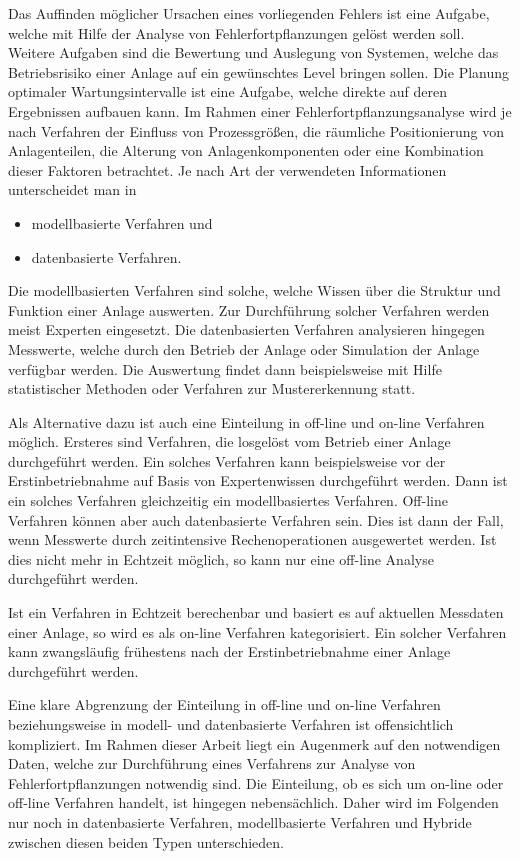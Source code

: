 Das Auffinden m\"oglicher Ursachen eines vorliegenden Fehlers ist eine Aufgabe, welche mit Hilfe der Analyse von Fehlerfortpflanzungen gel\"ost werden soll. Weitere Aufgaben sind die Bewertung und Auslegung von Systemen, welche das Betriebsrisiko einer Anlage auf ein gew\"unschtes Level bringen sollen. Die Planung optimaler Wartungsintervalle ist eine Aufgabe, welche direkte auf deren Ergebnissen aufbauen kann. \newline
Im Rahmen einer Fehlerfortpflanzungsanalyse wird je nach Verfahren der Einfluss von Prozessgr\"o\ss{}en, die r\"aumliche Positionierung von Anlagenteilen, die Alterung von Anlagenkomponenten oder eine Kombination dieser Faktoren betrachtet. Je nach Art der verwendeten Informationen unterscheidet man in \begin{itemize}
\item modellbasierte Verfahren und
\item datenbasierte Verfahren. 
\end{itemize} Die modellbasierten Verfahren sind solche, welche Wissen \"uber die Struktur und Funktion einer Anlage auswerten. Zur Durchf\"uhrung solcher Verfahren werden meist Experten eingesetzt. Die datenbasierten Verfahren analysieren hingegen Messwerte, welche durch den Betrieb der Anlage oder Simulation der Anlage verf\"ugbar werden. Die Auswertung findet dann beispielsweise mit Hilfe statistischer Methoden oder Verfahren zur Mustererkennung statt. 

Als Alternative dazu ist auch eine Einteilung in off-line und on-line Verfahren m\"oglich. Ersteres sind Verfahren, die losgel\"ost vom Betrieb einer Anlage durchgef\"uhrt werden. Ein solches Verfahren kann beispielsweise vor der Erstinbetriebnahme auf Basis von Expertenwissen durchgef\"uhrt werden. Dann ist ein solches Verfahren gleichzeitig ein modellbasiertes Verfahren. Off-line Verfahren k\"onnen aber auch datenbasierte Verfahren sein. Dies ist dann der Fall, wenn Messwerte durch zeitintensive Rechenoperationen ausgewertet werden. Ist dies nicht mehr in Echtzeit m\"oglich, so kann nur eine off-line Analyse durchgef\"uhrt werden.

Ist ein Verfahren in Echtzeit berechenbar und basiert es auf aktuellen Messdaten einer Anlage, so wird es als on-line Verfahren kategorisiert. Ein solcher Verfahren kann zwangsl\"aufig fr\"uhestens nach der Erstinbetriebnahme einer Anlage durchgef\"uhrt werden. 

Eine klare Abgrenzung der Einteilung in off-line und on-line Verfahren beziehungsweise in modell- und datenbasierte Verfahren ist offensichtlich kompliziert. Im Rahmen dieser Arbeit liegt ein Augenmerk auf den notwendigen Daten, welche zur Durchf\"uhrung eines Verfahrens zur Analyse von Fehlerfortpflanzungen notwendig sind. Die Einteilung, ob es sich um on-line oder off-line Verfahren handelt, ist hingegen nebens\"achlich. Daher wird im Folgenden nur noch in datenbasierte Verfahren, modellbasierte Verfahren und Hybride zwischen diesen beiden Typen unterschieden. 
  
